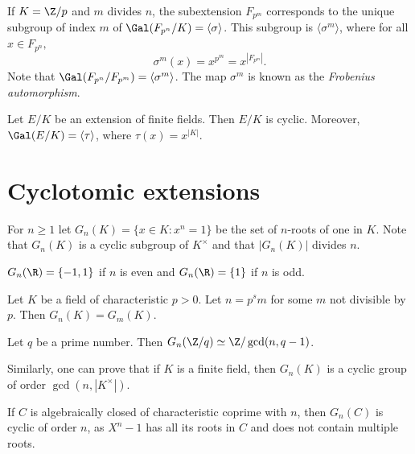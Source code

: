 If $K=\Z/p$ and 
$m$ divides $n$, the subextension $F_{p^m}$ corresponds 
to the unique
subgroup of index $m$ of $\Gal(F_{p^n}/K)=\langle\sigma\rangle$. This subgroup
is $\langle\sigma^m\rangle$, where for all $x \in F_{p^n},$
\[
\sigma^m(x)=x^{p^m}=x^{|F_{p^m}|}.
\]
Note that $\Gal(F_{p^n}/F_{p^m})=\langle\sigma^m\rangle$. 
The map $\sigma^m$ is known as 
the \emph{Frobenius automorphism}. 

\begin{exercise}
    Let $E/K$ be an extension of finite fields. Then $E/K$ 
    is cyclic. Moreover, $\Gal(E/K)=\langle\tau\rangle$, where $\tau(x)=x^{|K|}$. 
\end{exercise}




\section{Cyclotomic extensions}

For $n\geq1$ let $G_n(K)=\{x\in K:x^n=1\}$ be the 
set of $n$-roots of one in $K$. Note that
$G_n(K)$ is a cyclic subgroup of $K^{\times}$ and that 
$|G_n(K)|$ divides $n$. 

\begin{example}
    $G_n(\R)=\{-1,1\}$ if $n$ is even and $G_{n}(\R)=\{1\}$ if $n$ is odd.
\end{example}

\begin{exercise}
    Let $K$ be a field of characteristic $p>0$. Let $n=p^sm$ for some $m$ not divisible by $p$. 
    Then $G_n(K)=G_m(K)$. 
\end{exercise}

\begin{exercise}
    Let $q$ be a prime number. Then $G_n(\Z/q)\simeq\Z/\gcd(n,q-1)$. 
\end{exercise}

Similarly, one can prove that if $K$ is a finite field, then $G_n(K)$ is a cyclic group
of order $\gcd(n,|K^{\times}|)$. 

\begin{example}
    If $C$ is algebraically closed of characteristic coprime with $n$, 
    then $G_n(C)$ is cyclic of order $n$, as $X^n-1$ 
    has all its roots in $C$ and does not contain multiple roots. 
\end{example}

